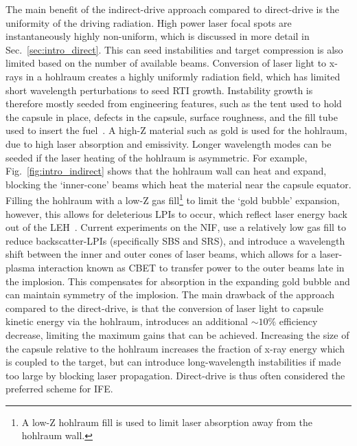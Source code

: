 The main benefit of the indirect-drive approach compared to direct-drive is the uniformity of the driving radiation.
High power laser focal spots are instantaneously highly non-uniform, which is discussed in more detail in Sec.~\ref{sec:intro_direct}. 
This can seed instabilities and target compression is also limited based on the number of available beams.
Conversion of laser light to x-rays in a hohlraum creates a highly uniformly radiation field, which has limited short wavelength perturbations to seed \ac{RTI} growth.
Instability growth is therefore mostly seeded from engineering features, such as the tent used to hold the capsule in place, defects in the capsule, surface roughness, and the fill tube used to insert the fuel~\cite{clark_threedimensional_2016}.
A high-Z material such as gold is used for the hohlraum, due to high laser absorption and emissivity.
Longer wavelength modes can be seeded if the laser heating of the hohlraum is asymmetric.
For example, Fig.~\ref{fig:intro_indirect} shows that the hohlraum wall can heat and expand, blocking the `inner-cone' beams which heat the material near the capsule equator.
Filling the hohlraum with a low-Z gas fill\footnote{A low-Z hohlraum fill is used to limit laser absorption away from the hohlraum wall.} to limit the `gold bubble' expansion, however, this allows for deleterious \ac{LPIs} to occur, which reflect laser energy back out of the \ac{LEH}~\cite{macgowan_laser_1996}.
Current experiments on the \ac{NIF}, use a relatively low gas fill to reduce backscatter-\ac{LPIs} (specifically \ac{SBS} and \ac{SRS}), and introduce a wavelength shift between the inner and outer cones of laser beams, which allows for a laser-plasma interaction known as \ac{CBET} to transfer power to the outer beams late in the implosion\cite{michel_tuning_2009,moody_multistep_2012,kritcher_energy_2018}.
This compensates for absorption in the expanding gold bubble and can maintain symmetry of the implosion.
The main drawback of the approach compared to the direct-drive, is that the conversion of laser light to capsule kinetic energy via the hohlraum, introduces an additional $\sim10\%$ efficiency decrease, limiting the maximum gains that can be achieved.
Increasing the size of the capsule relative to the hohlraum increases the fraction of x-ray energy which is coupled to the target, but can introduce long-wavelength instabilities if made too large by blocking laser propagation.
Direct-drive is thus often considered the preferred scheme for \ac{IFE}.

